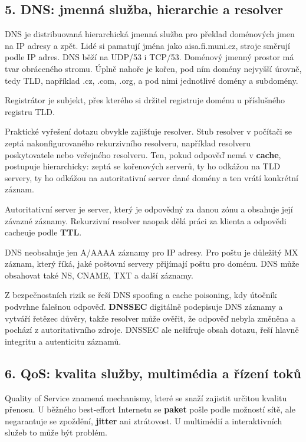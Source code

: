 \documentclass[11pt,a4paper]{article}
\begin{document}
\subsection*{5. DNS: jmenná služba, hierarchie a resolver}

DNS je distribuovaná hierarchická jmenná služba pro překlad doménových jmen na IP adresy a zpět. Lidé si pamatují jména jako aisa.fi.muni.cz, stroje směrují podle IP adres. DNS běží na UDP/53 i TCP/53. Doménový jmenný prostor má tvar obráceného stromu. Úplně nahoře je kořen, pod ním domény nejvyšší úrovně, tedy TLD, například .cz, .com, .org, a pod nimi jednotlivé domény a subdomény.

Registrátor je subjekt, přes kterého si držitel registruje doménu u příslušného registru TLD.

Praktické vyřešení dotazu obvykle zajišťuje resolver. Stub resolver v počítači se zeptá nakonfigurovaného rekurzivního resolveru, například resolveru poskytovatele nebo veřejného resolveru. Ten, pokud odpověď nemá v \textbf{cache}, postupuje hierarchicky: zeptá se kořenových serverů, ty ho odkážou na TLD servery, ty ho odkážou na autoritativní server dané domény a ten vrátí konkrétní záznam.

Autoritativní server je server, který je odpovědný za danou zónu a obsahuje její závazné záznamy. Rekurzivní resolver naopak dělá práci za klienta a odpovědi cacheuje podle \textbf{TTL}.

DNS neobsahuje jen A/AAAA záznamy pro IP adresy. Pro poštu je důležitý MX záznam, který říká, jaké poštovní servery přijímají poštu pro doménu. DNS může obsahovat také NS, CNAME, TXT a další záznamy.

Z bezpečnostních rizik se řeší DNS spoofing a cache poisoning, kdy útočník podvrhne falešnou odpověď. \textbf{DNSSEC} digitálně podepisuje DNS záznamy a vytváří řetězec důvěry, takže resolver může ověřit, že odpověď nebyla změněna a pochází z autoritativního zdroje. DNSSEC ale nešifruje obsah dotazu, řeší hlavně integritu a autenticitu záznamů.

\subsection*{6. QoS: kvalita služby, multimédia a řízení toků}

Quality of Service znamená mechanismy, které se snaží zajistit určitou kvalitu přenosu. U běžného best-effort Internetu se \textbf{paket} pošle podle možností sítě, ale negarantuje se zpoždění, \textbf{jitter} ani ztrátovost. U multimédií a interaktivních služeb to může být problém.
\end{document}
